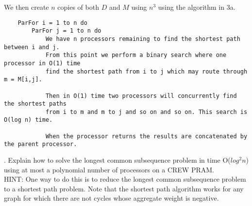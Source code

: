 \documentclass[10pt]{article}
\begin{document}
We then create $n$ copies of both $D$ and $M$ using $n^3$ using the algorithm in 3a. 
\begin{verbatim}
    ParFor i = 1 to n do
        ParFor j = 1 to n do
            We have n processors remaining to find the shortest path between i and j.
            From this point we perform a binary search where one processor in O(1) time
            find the shortest path from i to j which may route through m = M[i,j].

            Then in O(1) time two processors will concurrently find the shortest paths
            from i to m and m to j and so on and so on. This search is O(log n) time.
            
            When the processor returns the results are concatenated by the parent processor.
\end{verbatim}


. Explain how to solve the longest common subsequence problem in time O($log^2n$) using at most a
polynomial number of processors on a CREW PRAM.\\
HINT: One way to do this is to reduce the longest common subsequence problem to a shortest path
problem. Note that the shortest path algorithm works for any graph for which there are not cycles
whose aggregate weight is negative.\\
\\
\end{document}
